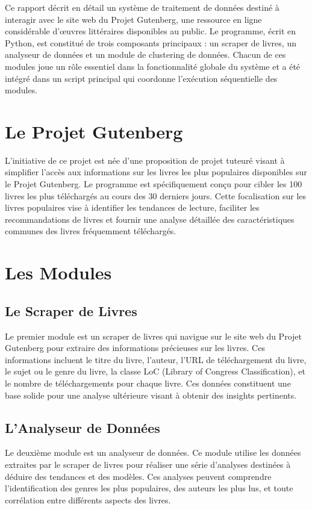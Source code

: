 
Ce rapport décrit en détail un système de traitement de données destiné à interagir avec le site web du Projet Gutenberg, une ressource en ligne considérable d'œuvres littéraires disponibles au public. Le programme, écrit en Python, est constitué de trois composants principaux : un scraper de livres, un analyseur de données et un module de clustering de données. Chacun de ces modules joue un rôle essentiel dans la fonctionnalité globale du système et a été intégré dans un script principal qui coordonne l'exécution séquentielle des modules.

\section{Le Projet Gutenberg}
L'initiative de ce projet est née d'une proposition de projet tuteuré visant à simplifier l'accès aux informations sur les livres les plus populaires disponibles sur le Projet Gutenberg. Le programme est spécifiquement conçu pour cibler les 100 livres les plus téléchargés au cours des 30 derniers jours. Cette focalisation sur les livres populaires vise à identifier les tendances de lecture, faciliter les recommandations de livres et fournir une analyse détaillée des caractéristiques communes des livres fréquemment téléchargés.

\section{Les Modules}
\subsection{Le Scraper de Livres}
Le premier module est un scraper de livres qui navigue sur le site web du Projet Gutenberg pour extraire des informations précieuses sur les livres. Ces informations incluent le titre du livre, l'auteur, l'URL de téléchargement du livre, le sujet ou le genre du livre, la classe LoC (Library of Congress Classification), et le nombre de téléchargements pour chaque livre. Ces données constituent une base solide pour une analyse ultérieure visant à obtenir des insights pertinents.

\subsection{L'Analyseur de Données}
Le deuxième module est un analyseur de données. Ce module utilise les données extraites par le scraper de livres pour réaliser une série d'analyses destinées à déduire des tendances et des modèles. Ces analyses peuvent comprendre l'identification des genres les plus populaires, des auteurs les plus lus, et toute corrélation entre différents aspects des livres.

